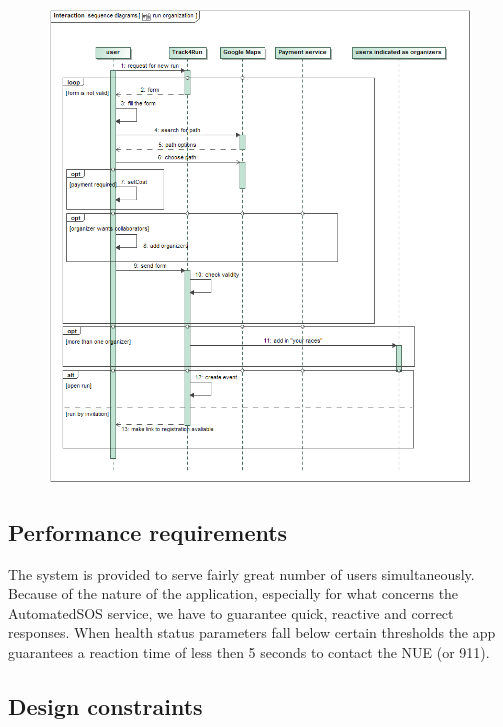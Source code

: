 \begin{figure}[h!] \ContinuedFloat
\centering
\includegraphics[scale=0.57]{sections/diagrams/run_organization.png} \newline
{}
\end{figure}

\clearpage

\subsection{Performance requirements}
The system is provided to serve fairly great number of users simultaneously. Because of the nature of the application, especially for what concerns the AutomatedSOS service, we have to guarantee quick, reactive and correct responses. When health status parameters fall below certain thresholds the app guarantees a reaction time of less then 5 seconds to contact the NUE (or 911).

\subsection{Design constraints}
